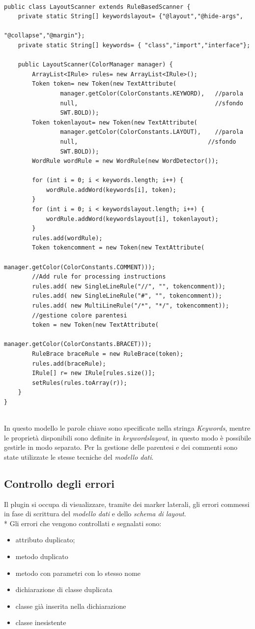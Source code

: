 \begin{lstlisting}[caption={LayoutScanner}, style={java}]

public class LayoutScanner extends RuleBasedScanner {
	private static String[] keywordslayout= {"@layout","@hide-args",
												"@collapse","@margin"};
	private static String[] keywords= { "class","import","interface"};
	
	public LayoutScanner(ColorManager manager) {
		ArrayList<IRule> rules= new ArrayList<IRule>();
		Token token= new Token(new TextAttribute(
				manager.getColor(ColorConstants.KEYWORD), 	//parola
				null,                                       //sfondo
				SWT.BOLD));
		Token tokenlayout= new Token(new TextAttribute(
				manager.getColor(ColorConstants.LAYOUT), 	//parola
				null,                                     //sfondo
				SWT.BOLD));
		WordRule wordRule = new WordRule(new WordDetector());

		for (int i = 0; i < keywords.length; i++) {
			wordRule.addWord(keywords[i], token);
		}
		for (int i = 0; i < keywordslayout.length; i++) {
			wordRule.addWord(keywordslayout[i], tokenlayout);
		}
		rules.add(wordRule);
		Token tokencomment = new Token(new TextAttribute(
								manager.getColor(ColorConstants.COMMENT)));
		//Add rule for processing instructions		
		rules.add( new SingleLineRule("//", "", tokencomment));
		rules.add( new SingleLineRule("#", "", tokencomment));
		rules.add( new MultiLineRule("/*", "*/", tokencomment));
        //gestione colore parentesi
		token = new Token(new TextAttribute(
										manager.getColor(ColorConstants.BRACET)));
		RuleBrace braceRule = new RuleBrace(token);
		rules.add(braceRule);
		IRule[] r= new IRule[rules.size()];
		setRules(rules.toArray(r));
	}
}


\end{lstlisting}

In questo modello le parole chiave sono specificate nella
stringa \emph{Keywords}, mentre le proprietà disponibili sono definite in
\emph{keywordslayout}, in questo modo è possibile gestirle in modo separato.
Per la gestione delle parentesi e dei commenti sono state utilizzate le stesse
tecniche del \emph{modello dati}.

\subsection{Controllo degli errori} 
Il plugin si occupa di visualizzare, tramite dei marker laterali, gli errori 
commessi in fase di scrittura del \emph{modello dati} e dello \emph{schema di
layout}. \\*
Gli errori che vengono controllati e segnalati sono:
\begin{itemize}
  \item attributo duplicato;
  \item metodo duplicato
  \item metodo con parametri con lo stesso nome
  \item dichiarazione di classe duplicata
  \item classe già inserita nella dichiarazione
  \item classe inesistente
\end{itemize} 

